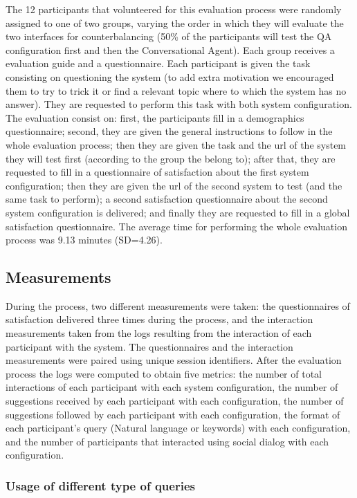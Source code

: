 The 12 participants that volunteered for this evaluation process were randomly assigned to one of two groups, varying the order in which they will evaluate the two interfaces for counterbalancing (50\% of the participants will test the QA configuration first and then the Conversational Agent). Each group receives a evaluation guide and a questionnaire. Each participant is given the task consisting on questioning the system (to add extra motivation we encouraged them to try to trick it or find a relevant topic where to which the system has no answer). They are requested to perform this task with both system configuration.
The evaluation consist on: first, the participants fill in a demographics questionnaire; second, they are given the general instructions to follow in the whole evaluation process; then they are given the task and the url of the system they will test first (according to the group the belong to); after that, they are requested to fill in a questionnaire of satisfaction about the first system configuration; then they are given the url of the second system to test (and the same task to perform); a second satisfaction questionnaire about the second system configuration is delivered; and finally they are requested to fill in a global satisfaction questionnaire. The average time for performing the whole evaluation process was 9.13 minutes (SD=4.26).



\subsection{Measurements}

During the process, two different measurements were taken: the questionnaires of satisfaction delivered three times during the process, and the interaction measurements taken from the logs resulting from the interaction of each participant with the system. The questionnaires and the interaction measurements were paired using unique session identifiers. After the evaluation process the logs were computed to obtain five metrics: the number of total interactions of each participant with each system configuration, the number of suggestions received by each participant with each configuration, the number of suggestions followed by each participant with each configuration, the format of each participant's query (Natural language or keywords) with each configuration, and the number of participants that interacted using social dialog with each configuration.

\subsubsection{Usage of different type of queries}

